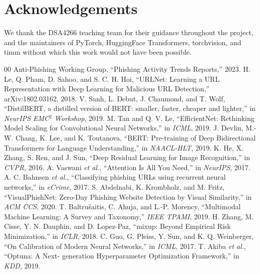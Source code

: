 \documentclass[conference]{IEEEtran}
\begin{document}
\section*{Acknowledgements}
We thank the DSA4266 teaching team for their guidance throughout
the project, and the maintainers of PyTorch, HuggingFace
Transformers, torchvision, and timm without which this work would
not have been possible.

\begin{thebibliography}{00}
 Anti-Phishing Working Group, ``Phishing Activity
Trends Reports,'' 2023.
 H. Le, Q. Pham, D. Sahoo, and S. C. H. Hoi,
``URLNet: Learning a URL Representation with Deep Learning for
Malicious URL Detection,'' arXiv:1802.03162, 2018.
 V. Sanh, L. Debut, J. Chaumond, and T. Wolf,
``DistilBERT, a distilled version of BERT: smaller, faster, cheaper
and lighter,'' in \emph{NeurIPS EMC$^2$ Workshop}, 2019.
 M. Tan and Q. V. Le, ``EfficientNet: Rethinking
Model Scaling for Convolutional Neural Networks,'' in \emph{ICML},
2019.
 J. Devlin, M.-W. Chang, K. Lee, and K. Toutanova,
``BERT: Pre-training of Deep Bidirectional Transformers for
Language Understanding,'' in \emph{NAACL-HLT}, 2019.
 K. He, X. Zhang, S. Ren, and J. Sun, ``Deep
Residual Learning for Image Recognition,'' in \emph{CVPR}, 2016.
 A. Vaswani \textit{et al.}, ``Attention Is All You
Need,'' in \emph{NeurIPS}, 2017.
 A. C. Bahnsen \textit{et al.}, ``Classifying
phishing URLs using recurrent neural networks,'' in \emph{eCrime},
2017.
 S. Abdelnabi, K. Krombholz, and M. Fritz,
``VisualPhishNet: Zero-Day Phishing Website Detection by Visual
Similarity,'' in \emph{ACM CCS}, 2020.
 T. Baltru\v{s}aitis, C. Ahuja, and
L.-P. Morency, ``Multimodal Machine Learning: A Survey and
Taxonomy,'' \emph{IEEE TPAMI}, 2019.
 H. Zhang, M. Cisse, Y. N. Dauphin, and D.
Lopez-Paz, ``mixup: Beyond Empirical Risk Minimization,'' in
\emph{ICLR}, 2018.
 C. Guo, G. Pleiss, Y. Sun, and K. Q.
Weinberger, ``On Calibration of Modern Neural Networks,'' in
\emph{ICML}, 2017.
 T. Akiba \textit{et al.}, ``Optuna: A Next-
generation Hyperparameter Optimization Framework,'' in
\emph{KDD}, 2019.
\end{thebibliography}
\end{document}

